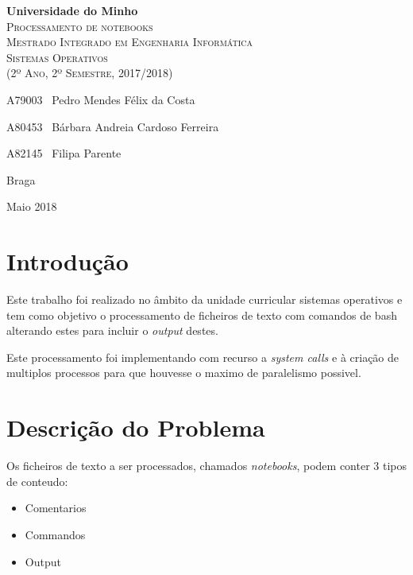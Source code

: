 \documentclass[12pt,a4paper]{report}
\begin{document}
\newcommand{\outputStart}[0]{$>>>$}
\newcommand{\outputEnd}[0]{$<<<$}

\begin{titlepage}
    \center
    {\huge {\bf Universidade do Minho}}\\[0.4cm]
    \vspace{3.0cm}
    \textsc{\huge{Processamento de notebooks}}\\[0.5cm]
    \vspace{3.0cm}
    \textsc{\huge{Mestrado Integrado em Engenharia Informática}}\\[0.5cm]
    \vspace{2.0cm}
    \textsc{Sistemas Operativos}\\[0.5cm]
    \textsc{(2º Ano, 2º Semestre, 2017/2018)}\\[0.5cm]
    \vspace{1.5cm}
    \begin{flushleft}
        A79003 \,\,\,Pedro Mendes Félix da Costa
        \vspace{0.2cm}

        A80453 \,\,\,Bárbara Andreia Cardoso Ferreira
        \vspace{0.2cm}

        A82145 \,\,\,Filipa Parente
    \end{flushleft}
        \vspace{1cm}
    \begin{flushright}
        Braga

        Maio 2018
    \end{flushright}

\end{titlepage}

\tableofcontents
\clearpage

\chapter{Introdução}
    Este trabalho foi realizado no âmbito da unidade curricular sistemas
    operativos e tem como objetivo o processamento de ficheiros de texto
    com comandos de bash alterando estes para incluir o \textit{output} destes.

    Este processamento foi implementando com recurso a \textit{system calls}
    e à criação de multiplos processos para que houvesse o maximo de
    paralelismo possivel.

\chapter{Descrição do Problema}
    Os ficheiros de texto a ser processados, chamados \textit{notebooks}, podem
    conter 3 tipos de conteudo:
    \begin{itemize}
        \item Comentarios
        \item Commandos
        \item Output
    \end{itemize}
\end{document}
